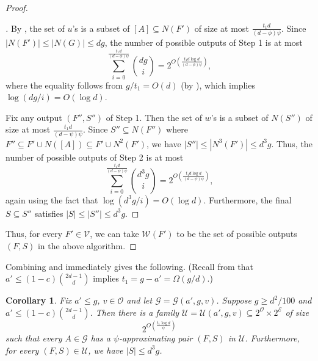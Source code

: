 \documentclass{amsart}
\newenvironment{subproof}[1][\proofname]{
  \renewcommand{\qedsymbol}{$\blacksquare$}
  \begin{proof}[#1]
}{
  \end{proof}
}
\newtheorem{cor}[thm]{Corollary}
\theoremstyle{definition}
\newcommand{\cO}{\mathcal{O} }
\newcommand{\cE}{\mathcal{E} }
\newcommand{\cG}{\mathcal{G} }
\newcommand{\cU}{\mathcal{U} }
\newcommand{\cV}{\mathcal{V} }
\newcommand{\cW}{\mathcal{W} }
\newcommand{\0}[0]{\emptyset}
\begin{document}
\begin{proof}
\begin{subproof}
By , the set of $u$'s is a subset of $[A]\subseteq N(F')$ of size at most $\frac{t_1d}{(d-\phi)\psi}$. Since $|N(F')|\leq|N(G)|\leq dg$, the number of possible outputs of Step 1 is at most
\[
\sum_{i=0}^{\frac{t_1d}{(d-\phi)\psi}}\binom{dg}{i}=2^{O\left(\frac{t_1d\log d}{(d-\phi)\psi}\right)},
\]
where the equality follows from $g/t_1 = O(d)$ (by ), which implies $\log(dg/i) = O(\log d)$. 

Fix any output $(F'',S'')$ of Step 1. Then the set of $w$'s is a subset of $N(S'')$ of size at most $\frac{t_1d}{(d-\psi)\psi}$. Since $S''\subseteq N(F'')$ where $F''\subseteq F'\cup N([A])\subseteq F'\cup N^2(F')$, we have $|S''|\leq |N^3(F')|\leq d^3g$. Thus, the number of possible outputs of Step 2 is at most
\[
\sum_{i=0}^{\frac{t_1d}{(d-\psi)\psi}}\binom{d^3g}{i}=2^{O\left(\frac{t_1d\log d}{(d-\psi)\psi}\right)},
\]
again using the fact that $\log(d^3g/i) = O(\log d)$. Furthermore, the final $S\subseteq S''$ satisfies $|S|\leq |S''|\leq d^3g$.
\end{subproof}

Thus, for every $F'\in\cV$, we can take $\cW(F')$ to be the set of possible outputs $(F,S)$ in the above algorithm.
\end{proof}


Combining  and  immediately gives the following. (Recall from  that $a'\leq (1-c)\binom{2d-1}{d}$ implies $t_1=g-a'=\Omega(g/d)$.) 

\begin{cor}\label{cor:psi-approx}
Fix $a'\leq g$, $v\in\cO$ and let $\cG=\cG(a',g,v)$. Suppose $g\geq d^2/100$ and $a'\leq (1-c)\binom{2d-1}{d}$.
    Then there is a family $\mathcal U=\cU(a',g,v)\subseteq 2^{\cO}\times 2^{\cE}$ of size
    \[
    2^{O\left(\frac{t_1\log d}{\psi}\right)}
    \]
    such that every $A\in\cG$ has a $\psi$-approximating pair $(F,S)$ in $\mathcal U$. Furthermore, for every $(F,S)\in\cU$, we have $|S|\leq d^3g$.
\end{cor}
\end{document}
